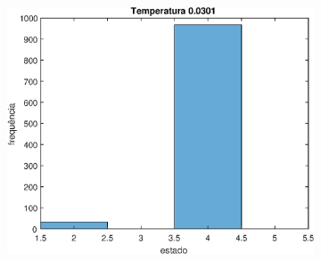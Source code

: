 \documentclass[12pt]{article}
\newenvironment{exercise}[2][Exercício]{\begin{trivlist}
\item[\hskip \labelsep {\bfseries #1}\hskip \labelsep {\bfseries #2.}]}{\end{trivlist}}
\begin{document}
\begin{exercise}{2.e}
\begin{figure}[H]
\begin{subfigure}[b]{0.3\textwidth}
        \includegraphics[width=\textwidth]{figs/ex2e_h9.eps}
    \end{subfigure}
\end{figure}


\end{exercise}
\end{document}
